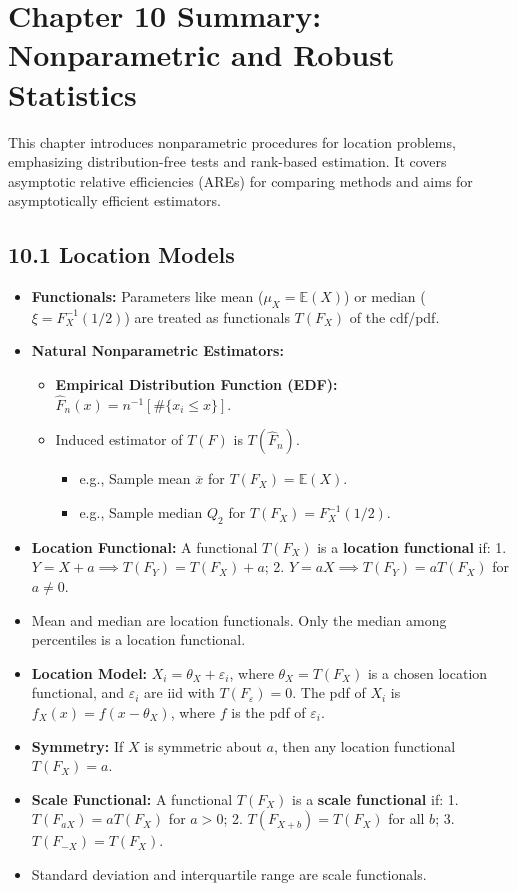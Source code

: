 \section{Chapter 10 Summary: Nonparametric and Robust Statistics}

This chapter introduces nonparametric procedures for location problems, emphasizing distribution-free tests and rank-based estimation. It covers asymptotic relative efficiencies (AREs) for comparing methods and aims for asymptotically efficient estimators.

\subsection{10.1 Location Models}

\begin{itemize}
	\item \textbf{Functionals:} Parameters like mean ($\mu_X = \mathbb{E}(X)$) or median ($\xi = F_X^{-1}(1/2)$) are treated as functionals $T(F_X)$ of the cdf/pdf.
	\item \textbf{Natural Nonparametric Estimators:}
	\begin{itemize}
		\item \textbf{Empirical Distribution Function (EDF):} $\widehat{F}_n(x) = n^{-1}[\#\{x_i \le x\}]$.
		\item Induced estimator of $T(F)$ is $T(\widehat{F}_n)$.
		\begin{itemize}
			\item e.g., Sample mean $\overline{x}$ for $T(F_X)=\mathbb{E}(X)$.
			\item e.g., Sample median $Q_2$ for $T(F_X)=F_X^{-1}(1/2)$.
		\end{itemize}
	\end{itemize}
	\item \textbf{Location Functional:} A functional $T(F_X)$ is a \textbf{location functional} if: 1. $Y=X+a \implies T(F_Y) = T(F_X)+a$; 2. $Y=aX \implies T(F_Y) = aT(F_X)$ for $a \neq 0$.
	\item Mean and median are location functionals. Only the median among percentiles is a location functional.
	\item \textbf{Location Model:} $X_i = \theta_X + \varepsilon_i$, where $\theta_X = T(F_X)$ is a chosen location functional, and $\varepsilon_i$ are iid with $T(F_\varepsilon)=0$. The pdf of $X_i$ is $f_X(x) = f(x - \theta_X)$, where $f$ is the pdf of $\varepsilon_i$.
	\item \textbf{Symmetry:} If $X$ is symmetric about $a$, then any location functional $T(F_X) = a$.
	\item \textbf{Scale Functional:} A functional $T(F_X)$ is a \textbf{scale functional} if: 1. $T(F_{aX}) = aT(F_X)$ for $a > 0$; 2. $T(F_{X+b}) = T(F_X)$ for all $b$; 3. $T(F_{-X}) = T(F_X)$.
	\item Standard deviation and interquartile range are scale functionals.
\end{itemize}

